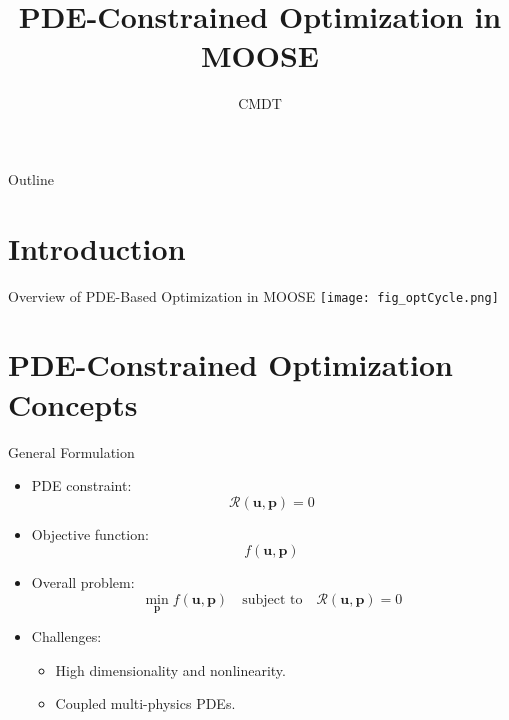 \documentclass[10pt,aspectratio=169]{beamer}
\title{PDE-Constrained Optimization in MOOSE}
\author{CMDT}
\institute{Idaho National Lab}
\date{}
\begin{document}
\begin{frame}
    \titlepage
\end{frame}

\begin{frame}{Outline}
	\vspace{0.5cm}
    \tableofcontents
\end{frame}

\section{Introduction}

\begin{frame}{Overview of PDE-Based Optimization in MOOSE}
    \centering
\texttt{[image: fig\_optCycle.png]}
\end{frame}

\section{PDE-Constrained Optimization Concepts}

\begin{frame}{General Formulation}
    \begin{itemize}
        \item PDE constraint: 
        \[
          \mathcal{R}(\mathbf{u}, \mathbf{p}) = 0
        \]
        \item Objective function: 
        \[
          f(\mathbf{u}, \mathbf{p})
        \]
        \item Overall problem:
        \[
          \min_{\mathbf{p}} f(\mathbf{u}, \mathbf{p}) 
          \quad \text{subject to} \quad 
          \mathcal{R}(\mathbf{u}, \mathbf{p}) = 0
        \]
        \item Challenges:
        \begin{itemize}
            \item High dimensionality and nonlinearity.
            \item Coupled multi-physics PDEs.
        \end{itemize}
    \end{itemize}
\end{frame}
\end{document}
